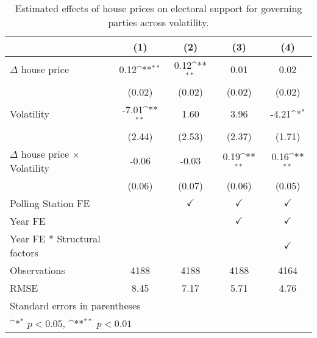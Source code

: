 \begin{table}[htbp]\centering
\def\sym#1{\ifmmode^{#1}\else\(^{#1}\)\fi}
\caption{Estimated effects of house prices on electoral support for governing parties across volatility.}
\begin{tabular}{l*{4}{c}}
\hline\hline
                    &\multicolumn{1}{c}{(1)}        &\multicolumn{1}{c}{(2)}        &\multicolumn{1}{c}{(3)}        &\multicolumn{1}{c}{(4)}        \\
\hline
$\Delta$ house price&        0.12\sym{**}&        0.12\sym{**}&        0.01        &        0.02        \\
                    &      (0.02)        &      (0.02)        &      (0.02)        &      (0.02)        \\
[1em]
Volatility          &       -7.01\sym{**}&        1.60        &        3.96        &       -4.21\sym{*} \\
                    &      (2.44)        &      (2.53)        &      (2.37)        &      (1.71)        \\
[1em]
$\Delta$ house price $\times$ Volatility&       -0.06        &       -0.03        &        0.19\sym{**}&        0.16\sym{**}\\
                    &      (0.06)        &      (0.07)        &      (0.06)        &      (0.05)        \\
[1em]
\hline Polling Station FE&                    &$\checkmark$        &$\checkmark$        &$\checkmark$        \\
[1em]
Year FE             &                    &                    &$\checkmark$        &$\checkmark$        \\
[1em]
Year FE * Structural factors&                    &                    &                    &$\checkmark$        \\
\hline
Observations        &        4188        &        4188        &        4188        &        4164        \\
RMSE                &        8.45        &        7.17        &        5.71        &        4.76        \\
\hline\hline
\multicolumn{5}{l}{\footnotesize Standard errors in parentheses}\\
\multicolumn{5}{l}{\footnotesize \sym{*} \(p<0.05\), \sym{**} \(p<0.01\)}\\
\end{tabular}
\end{table}

